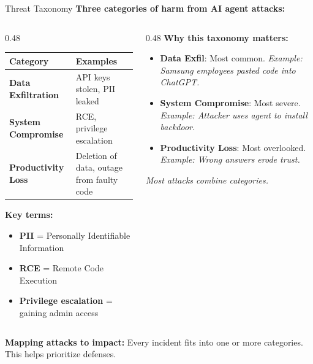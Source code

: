\documentclass[aspectratio=169,9pt]{beamer}
\begin{document}
\begin{frame}{Threat Taxonomy}
\textbf{Three categories of harm from AI agent attacks:}

\begin{columns}[T]
\begin{column}{0.48\textwidth}
\small
\begin{tabular}{p{2.5cm}|p{4cm}}
\toprule
\textbf{Category} & \textbf{Examples} \\
\midrule
\textbf{Data Exfiltration} & API keys stolen, PII leaked \\
\textbf{System Compromise} & RCE, privilege escalation \\
\textbf{Productivity Loss} & Deletion of data, outage from faulty code \\
\bottomrule
\end{tabular}

\vspace{0.8em}
\textbf{Key terms:}
\begin{itemize}\small
  \item \textbf{PII} = Personally Identifiable Information
  \item \textbf{RCE} = Remote Code Execution
  \item \textbf{Privilege escalation} = gaining admin access
\end{itemize}
\end{column}

\begin{column}{0.48\textwidth}
\textbf{Why this taxonomy matters:}\\[0.3em]
\begin{itemize}\small
  \item \textbf{Data Exfil}: Most common. \textit{Example: Samsung employees pasted code into ChatGPT.}
  \item \textbf{System Compromise}: Most severe. \textit{Example: Attacker uses agent to install backdoor.}
  \item \textbf{Productivity Loss}: Most overlooked. \textit{Example: Wrong answers erode trust.}
\end{itemize}
\vspace{0.3em}
\textit{Most attacks combine categories.}
\end{column}
\end{columns}

\vspace{0.3em}
\begin{graybox}
\textbf{Mapping attacks to impact:} Every incident fits into one or more categories. This helps prioritize defenses.
\end{graybox}
\end{frame}
\end{document}

